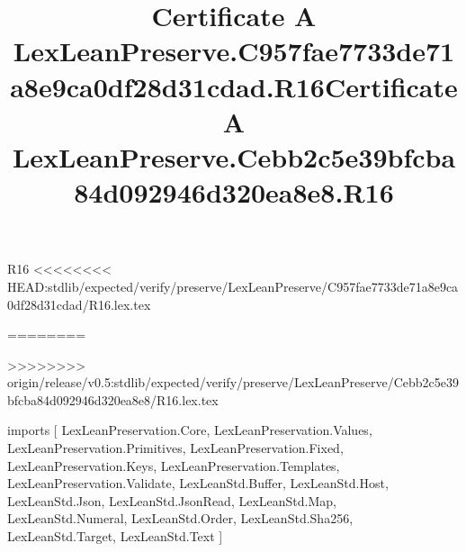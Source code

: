 \begin{lexlean}{R16}
<<<<<<<< HEAD:stdlib/expected/verify/preserve/LexLeanPreserve/C957fae7733de71a8e9ca0df28d31cdad/R16.lex.tex
\title{Certificate A LexLeanPreserve.C957fae7733de71a8e9ca0df28d31cdad.R16}
========
\title{Certificate A LexLeanPreserve.Cebb2c5e39bfcba84d092946d320ea8e8.R16}
>>>>>>>> origin/release/v0.5:stdlib/expected/verify/preserve/LexLeanPreserve/Cebb2c5e39bfcba84d092946d320ea8e8/R16.lex.tex
\begin{coremodule}
imports [
  LexLeanPreservation.Core,
  LexLeanPreservation.Values,
  LexLeanPreservation.Primitives,
  LexLeanPreservation.Fixed,
  LexLeanPreservation.Keys,
  LexLeanPreservation.Templates,
  LexLeanPreservation.Validate,
  LexLeanStd.Buffer,
  LexLeanStd.Host,
  LexLeanStd.Json,
  LexLeanStd.JsonRead,
  LexLeanStd.Map,
  LexLeanStd.Numeral,
  LexLeanStd.Order,
  LexLeanStd.Sha256,
  LexLeanStd.Target,
  LexLeanStd.Text
]


\end{coremodule}
\end{lexlean}
